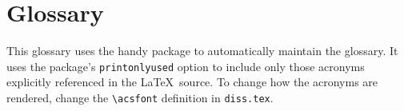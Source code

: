 
\chapter{Glossary}

This glossary uses the handy  package to automatically
maintain the glossary.  It uses the package's \texttt{printonlyused}
option to include only those acronyms explicitly referenced in the
\LaTeX\ source.  To change how the acronyms are rendered, change the
\verb+\acsfont+ definition in \verb+diss.tex+.


